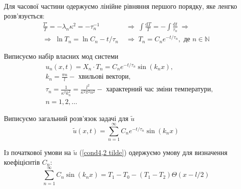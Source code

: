 Для часової частини одержуємо лінійне рівняння першого порядку, яке ленгко розв'язується:
\begin{equation} \label{time-eq4,2}
    \begin{aligned}
        \frac{T'}{T} = -\lambda_n \kappa^2 = -\tau_n^{-1}
        \;&\Rightarrow\;
        \int \frac{\mathrm{d} T}{T} = - \int \frac{\mathrm{d} t}{\tau_n}
        \;\Rightarrow\\
        \Rightarrow\;
        \ln{T_n} = \ln{C_n} - t/\tau_n
        \;&\Rightarrow\;
        T_n = C_n e^{-t/\tau_n}, \text{ де } n \in \mathbb{N}
    \end{aligned}
\end{equation}

Виписуємо набір власних мод  системи
\begin{equation}
    \begin{aligned}
        \;&u_n(x,t) = X_n \cdot T_n = C_n e^{-t/\tau_n} \sin(k_n x),\\
        &k_n = \frac{\pi n}{l} - \text{ хвильові вектори}, \\
        &\tau_n = \frac{1}{\kappa^2 k_n^2} = \frac{l^2}{\kappa^2 \pi^2 n^2} - \text{ характерний час зміни температури}, \\
        &n = 1, 2,\ldots
    \end{aligned}
\end{equation}

Виписуємо загальний розв'язок задачі для $\widetilde{u}$ 
\begin{equation}
     \widetilde{u}(x,t) = \sum_{n=1}^{\infty}C_n e^{-t/\tau_n} \sin(k_n x)
\end{equation}

Із початкової умови на $\widetilde{u}$  (\ref{cond4,2 tilde}) одержуємо умову для визначення коефіцієнтів $C_n$:
\begin{equation}
    \sum_{n=1}^{\infty}C_n \sin(k_n x) =  T_1 - T_0 - (T_1 - T_2)\Theta(x - l/2)
\end{equation}

